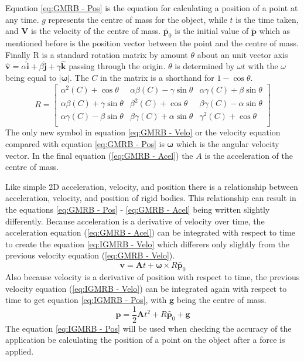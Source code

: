 Equation \ref{eq:GMRB - Pos} is the equation for calculating a position of a point at any time. $g$ represents the centre of mass for the object, while $t$ is the time taken, and $\mathbf{V}$ is the velocity of the centre of mass. $\tilde{\mathbf{p}_{0}}$ is the initial value of $\tilde{\mathbf{p}}$ which as mentioned before is the position vector between the point and the centre of mass.
Finally R is a standard rotation matrix by amount $\theta$ about an unit vector axis $\hat{\mathbf{v}} = \alpha\hat{\mathbf{i}} + \beta\hat{\mathbf{j}} + \gamma\hat{\mathbf{k}}$ passing through the origin.
$\theta$ is determined by $\omega t$ with the $\omega$ being equal to $|\boldsymbol{\omega}|$.
The $C$ in the matrix is a shorthand for $1-\cos\theta$.
\begin{equation}\label{ma:Rotation}
R = 
\begin{bmatrix}
  {\alpha}^{2}(C) + \cos\theta & 
  \alpha\beta(C) - \gamma\sin\theta & 
  \alpha\gamma(C) + \beta\sin\theta \\
  
  \alpha\beta(C) + \gamma\sin\theta & 
  {\beta}^{2}(C) + \cos\theta & 
  \beta\gamma(C) - \alpha\sin\theta \\
  
  \alpha\gamma(C) - \beta\sin\theta & 
  \beta\gamma(C) + \alpha\sin\theta & 
  {\gamma}^{2}(C) + \cos\theta \\
\end{bmatrix}
\end{equation}
The only new symbol in equation \ref{eq:GMRB - Velo} or the velocity equation compared with equation \ref{eq:GMRB - Pos} is $\boldsymbol{\omega}$ which is the angular velocity vector. In the final equation (\ref{eq:GMRB - Acel}) the $A$ is the acceleration of the centre of mass.

Like simple 2D acceleration, velocity, and position there is a relationship between acceleration, velocity, and position of rigid bodies.
This relationship can result in the equations \ref{eq:GMRB - Pos} - \ref{eq:GMRB - Acel} being written slightly differently.
Because acceleration is a derivative of velocity over time, the acceleration equation (\ref{eq:GMRB - Acel}) can be integrated with respect to time to create the equation \ref{eq:IGMRB - Velo} which differers only slightly from the previous velocity equation (\ref{eq:GMRB - Velo}).
\begin{equation}\label{eq:IGMRB - Velo}
\mathbf{v}=\mathbf{A}t+\boldsymbol\omega\times{R}\tilde{\mathbf{p}_{0}}
\end{equation}
Also because velocity is a derivative of position with respect to time, the previous velocity equation (\ref{eq:IGMRB - Velo}) can be integrated again with respect to time to get equation \ref{eq:IGMRB - Pos}, with $\mathbf{g}$ being the centre of mass.
\begin{equation}\label{eq:IGMRB - Pos}
\mathbf{p}=\frac{1}{2}\mathbf{A}t^{2}+{R}\tilde{\mathbf{p}_{0}}+\mathbf{g}
\end{equation}
The equation \ref{eq:IGMRB - Pos} will be used when checking the accuracy of the application be calculating the position of a point on the object after a force is applied.
